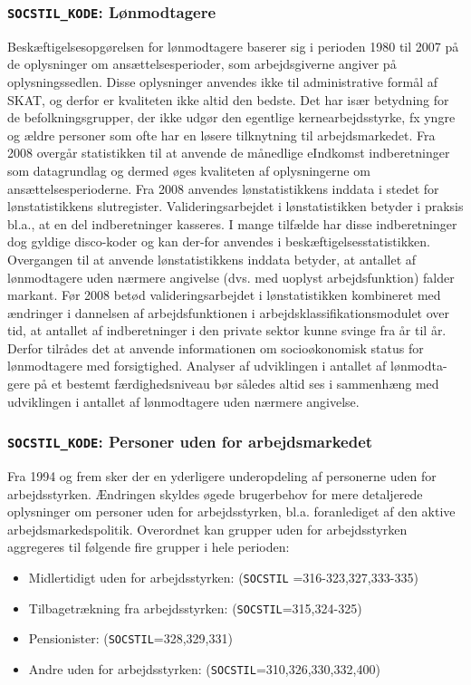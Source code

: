 {\subsubsection{\texttt{SOCSTIL\_KODE}: Lønmodtagere \label{}}

Beskæftigelsesopgørelsen for lønmodtagere baserer sig i perioden 1980 til 2007 på de oplysninger om ansættelsesperioder, som arbejdsgiverne angiver på oplysningssedlen. Disse oplysninger anvendes ikke til administrative formål af SKAT, og derfor er kvaliteten ikke altid den bedste. Det har især betydning for de befolkningsgrupper, der ikke udgør den egentlige kernearbejdsstyrke, fx yngre og ældre personer som ofte har en løsere tilknytning til arbejdsmarkedet. Fra 2008 overgår statistikken til at anvende de månedlige eIndkomst indberetninger som datagrundlag og dermed øges kvaliteten af oplysningerne om ansættelsesperioderne. Fra 2008 anvendes lønstatistikkens inddata i stedet for lønstatistikkens slutregister. Valideringsarbejdet i lønstatistikken betyder i praksis bl.a., at en del indberetninger kasseres. I mange tilfælde har disse indberetninger dog gyldige disco-koder og kan der-for anvendes i beskæftigelsesstatistikken. Overgangen til at anvende lønstatistikkens inddata betyder, at antallet af lønmodtagere uden nærmere angivelse (dvs. med uoplyst arbejdsfunktion) falder markant. Før 2008 betød valideringsarbejdet i lønstatistikken kombineret med ændringer i dannelsen af arbejdsfunktionen i arbejdsklassifikationsmodulet over tid, at antallet af indberetninger i den private sektor kunne svinge fra år til år. Derfor tilrådes det at anvende informationen om socioøkonomisk status for lønmodtagere med forsigtighed. Analyser af udviklingen i antallet af lønmodta-gere på et bestemt færdighedsniveau bør således altid ses i sammenhæng med udviklingen i antallet af lønmodtagere uden nærmere angivelse.


\subsubsection{\texttt{SOCSTIL\_KODE}: Personer uden for arbejdsmarkedet \label{}}

Fra 1994 og frem sker der en yderligere underopdeling af personerne uden for arbejdsstyrken. Ændringen skyldes øgede brugerbehov for mere detaljerede oplysninger om personer uden for arbejdsstyrken, bl.a. foranlediget af den aktive arbejdsmarkedspolitik. Overordnet kan grupper uden for arbejdsstyrken aggregeres til følgende fire grupper i hele perioden:
\begin{itemize} [topsep=6pt,itemsep=-1ex]
  \item Midlertidigt uden for arbejdsstyrken: (\texttt{SOCSTIL} =316-323,327,333-335)
  \item Tilbagetrækning fra arbejdsstyrken: (\texttt{SOCSTIL}=315,324-325)
  \item Pensionister: (\texttt{SOCSTIL}=328,329,331)
  \item Andre uden for arbejdsstyrken: (\texttt{SOCSTIL}=310,326,330,332,400)
\end{itemize}

}
